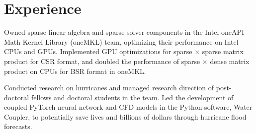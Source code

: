 \documentclass[letterpaper,10pt]{article}
\begin{document}
%
%
%
%


\vspace{-2pt}
\section{Experience}
  \resumeSubHeadingListStart


        \resumeItemListStart
            {Owned sparse linear algebra and sparse solver components in the
            Intel\textsuperscript{\scriptsize{\textregistered}} oneAPI Math
            Kernel Library (oneMKL) team, optimizing their performance on Intel
            CPUs and GPUs.}
            {Implemented GPU optimizations for sparse $\times$ sparse matrix
            product for CSR format, and doubled the performance of sparse
            $\times$ dense matrix product on CPUs for BSR format in oneMKL.}
        \resumeItemListEnd

 
        \resumeItemListStart
            {Conducted research on hurricanes and managed research direction
            of post-doctoral fellows and doctoral students in the team.}
            {Led the development of coupled PyTorch neural network and CFD
            models in the Python software, Water Coupler, to potentially save
            lives and billions of dollars through hurricane flood forecasts.}
        \resumeItemListEnd
\end{document}
